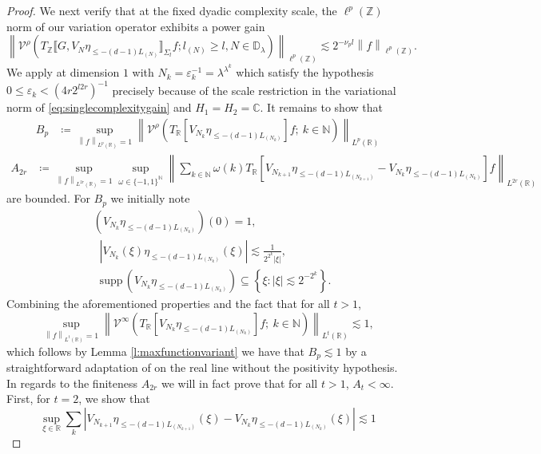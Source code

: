 \documentclass[12pt,leqno]{amsart}
\def\eps{\varepsilon}
\def\R {\mathbb{R}}
\def\N {\mathbb{N}}
\def\supp {{\mathrm{supp}\,}}
\def\Z {{\mathbb Z}}
\numberwithin{equation}{section}
\numberwithin{counter2}{section}
\theoremstyle{definition}
\theoremstyle{plain}
\begin{document}
\begin{proof}
		We next verify that at the fixed dyadic complexity scale, the $\ell^p(\Z)$ norm of our variation operator exhibits a power gain   \begin{equation} \label{eq:singlecomplexitygain}
			\left \| \mathcal{V}^{\rho}\left(T_{\Z} \llbracket G, V_N \eta_{\leq -(d-1)L_{(N)}} \rrbracket_{\Sigma_l} f; l_{(N)} \geq l, N \in \mathbb{D}_{\lambda}\right)  \right \|_{\ell^p(\Z)} \lesssim 2^{-\nu_p l} \left \| f \right \|_{\ell^p(\Z)}. 
		\end{equation}
		We apply \cite[Theorem 5.2]{KMSZ26} at dimension $1$ with $N_k=\eps_k^{-1}=\lambda^{\lambda^k}$ which satisfy the hypothesis $0 \leq \eps_k < (4r 2^{l2r})^{-1}$ precisely because of the scale restriction in the variational norm of \eqref{eq:singlecomplexitygain} and $H_1=H_2=\mathbb{C}.$ It remains to show that 
		\begin{equation}
			\begin{split}
				B_p & \coloneqq  \sup_{ \left \| f \right \|_{L^p(\R)} =1 }  \left \|  \mathcal{V}^{\rho}\left( T_{\R} [V_{N_k}\eta_{\leq -(d-1)L_{(N_k)}} ] f ; \ k\in \N \right) \right \|_{ L^p(\R)}
			\end{split}
		\end{equation}
		\begin{equation}
			\begin{split}
				A_{2r} & \coloneqq   \sup_{ \left \| f \right \|_{L^{2r}(\R)} =1 }\sup_{\omega \in \{-1,1\}^{\N}  } \left \| \sum_{k \in \N} \omega(k) T_{\R} \left[ V_{N_{k+1}}\eta_{\leq -(d-1)L_{(N_{k+1})}} - V_{N_k}\eta_{\leq -(d-1)L_{(N_k)}} \right]f  \right \|_{L^{2r}(\R)} 
			\end{split}
		\end{equation}
        are bounded. 
		For $B_p$ we initially note  \[ \begin{split}
			&	 \left(V_{N_k}\eta_{\leq -(d-1)L_{(N_k)}}\right)(0)=1,\\
            &\;\;    \left|V_{N_k}(\xi)\eta_{\leq -(d-1)L_{(N_k)}}(\xi)\right| \lesssim \frac{1}{2^{2^{k}} |\xi| },  \\
            &\; \;  \supp\left(V_{N_k}\eta_{\leq -(d-1)L_{(N_k)}}\right) \subseteq \left\{ \xi: |\xi| \lesssim 2^{-2^k}  \right\}. 
		\end{split} \]  Combining the aforementioned properties and the fact that for all $t>1$, \[ \sup_{ \left \| f \right \|_{L^t(\R)} =1 }  \left \|  \mathcal{V}^{\infty}\left( T_{\R} [V_{N_k}\eta_{\leq -(d-1)L_{(N_k)}} ] f ; \ k\in \N \right) \right \|_{ L^t(\R)} \lesssim 1, \] which follows by Lemma \ref{l:maxfunctionvariant} we have that $B_p \lesssim 1$ by a straightforward adaptation of \cite[Remark 3.134]{KrauseBook} on the real line without the positivity  hypothesis. In regards to the finiteness $A_{2r}$ we will in fact prove that for all $t>1$,  $A_{t}< \infty.$ First, for $t=2$, we show that  \begin{equation}\label{eq:linfty} \sup_{\xi \in \R }\sum_{k}\left|V_{N_{k+1}}\eta_{\leq -(d-1)L_{(N_{k+1})}}(\xi) - V_{N_k}\eta_{\leq -(d-1)L_{(N_k)}}(\xi) \right| \lesssim 1

\end{equation}
\end{proof}
\end{document}
